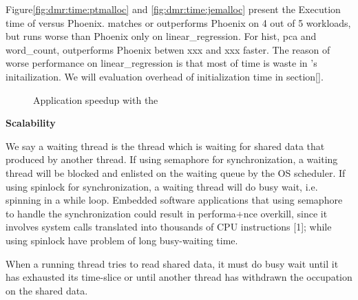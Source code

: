 Figure\ref{fig:dmr:time:ptmalloc} and \ref{fig:dmr:time:jemalloc}
present the Execution time of \myds versus Phoenix.
\myds matches or outperforms Phoenix on 4 out of 5 workloads,
but runs worse than Phoenix only on linear\_regression.
For hist, pca and word\_count, 
\myds outperforms Phoenix betwen xxx and xxx faster.
The reason of worse performance on linear\_regression 
is that most of time is waste in \myds's initailization.
We will evaluation overhead of initialization time in section\ref{}.



\begin{figure}[htpb]
\centering
  \caption{ Application speedup with the \myds}
   \label{fig:scalability}
\end{figure}
{\bf Scalability}


We say a waiting thread is the thread which is waiting for shared
data that produced by another thread. If using semaphore for
synchronization, a waiting thread will be blocked and enlisted
on the waiting queue by the OS scheduler. If using spinlock
for synchronization, a waiting thread will do busy wait, i.e.
spinning in a while loop. Embedded software applications
that using semaphore to handle the synchronization could
result in performa+nce overkill, since it involves system calls
translated into thousands of CPU instructions [1]; while using
spinlock have problem of long busy-waiting time.

When a running thread tries to read shared data,
it must do busy wait until it has exhausted its time-slice
or until another thread has withdrawn the occupation on the
shared data. 




